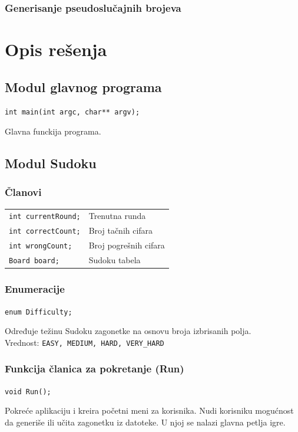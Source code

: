 \documentclass[a4paper]{article}
\begin{document}
    \subsubsection{Generisanje pseudoslučajnih brojeva}
    \newpage
    
    \section{Opis rešenja}
    
    \subsection{Modul glavnog programa}
    \texttt{int main(int argc, char** argv);}
    \par Glavna funckija programa.

    \subsection{Modul Sudoku}
    
    \subsubsection{Članovi}
    \begin{tabular}{ l l }
        \texttt{int currentRound;} & Trenutna runda\\
        \texttt{int correctCount;} & Broj tačnih cifara\\
        \texttt{int wrongCount;} & Broj pogrešnih cifara\\
        \texttt{Board board;} & Sudoku tabela\\
    \end{tabular}
    
    \subsubsection{Enumeracije}
    \texttt{enum Difficulty;}
    \par Određuje težinu Sudoku zagonetke na osnovu broja izbrisanih polja. \\ 
    Vrednost: \texttt{EASY, MEDIUM, HARD, VERY\_HARD}

    \subsubsection{Funkcija članica za pokretanje (Run)}
    \texttt{void Run();}
    \par Pokreće aplikaciju i kreira početni meni za korisnika. Nudi korisniku mogućnost da generiše ili učita zagonetku iz datoteke. 
    U njoj se nalazi glavna petlja igre.
\end{document}
